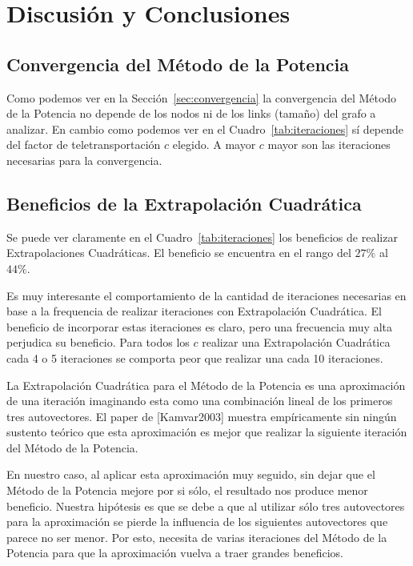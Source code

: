 \section{Discusión y Conclusiones}

\subsection{Convergencia del Método de la Potencia}

Como podemos ver en la Sección~\ref{sec:convergencia} la convergencia del
Método de la Potencia no depende de los nodos ni de los links (tamaño) del
grafo a analizar. En cambio como podemos ver en el Cuadro~\ref{tab:iteraciones}
sí depende del factor de teletransportación $c$ elegido. A mayor $c$ mayor son
las iteraciones necesarias para la convergencia.

\subsection{Beneficios de la Extrapolación Cuadrática}

Se puede ver claramente en el Cuadro~\ref{tab:iteraciones} los beneficios de
realizar Extrapolaciones Cuadráticas. El beneficio se encuentra en el rango del
$27\%$ al $44\%$.

Es muy interesante el comportamiento de la cantidad de iteraciones necesarias
en base a la frequencia de realizar iteraciones con Extrapolación Cuadrática.
El beneficio de incorporar estas iteraciones es claro, pero una frecuencia muy
alta perjudica su beneficio. Para todos los $c$ realizar una Extrapolación
Cuadrática cada 4 o 5 iteraciones se comporta peor que realizar una cada 10
iteraciones.

La Extrapolación Cuadrática para el Método de la Potencia es una aproximación
de una iteración imaginando esta como una combinación lineal de los primeros
tres autovectores. El paper de [Kamvar2003] muestra empíricamente sin ningún
sustento teórico que esta aproximación es mejor que realizar la siguiente
iteración del Método de la Potencia.

En nuestro caso, al aplicar esta aproximación muy seguido, sin dejar que el
Método de la Potencia mejore por si sólo, el resultado nos produce menor
beneficio. Nuestra hipótesis es que se debe a que al utilizar sólo tres
autovectores para la aproximación se pierde la influencia de los siguientes
autovectores que parece no ser menor. Por esto, necesita de varias iteraciones
del Método de la Potencia para que la aproximación vuelva a traer grandes
beneficios.


